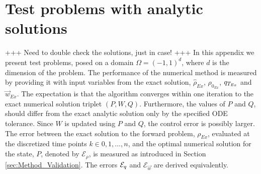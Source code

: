 \section{Test problems with analytic solutions}\label{app:TestProblems}
+++ Need to double check the solutions, just in case! +++
In this appendix we present test problems, posed on a domain $\Omega=(-1,1)^d$, where $d$ is the dimension of the problem. The performance of the numerical method is measured by providing it with input variables from the exact solution, $\widehat \rho_{Ex}$, $\rho_{0_{Ex}}$, $q_{T_{Ex}}$ and $\vec{w}_{Ex}$. The expectation is that the algorithm converges within one iteration to the exact numerical solution triplet $(P,W,Q)$. Furthermore, the values of $P$ and $Q$, should differ from the exact analytic solution only by the specified ODE tolerance. Since $W$ is updated using $P$ and $Q$, the control error is possibly larger.
The error between the exact solution to the forward problem, $\rho_{Ex}$, evaluated at the discretized time points $k \in 0,1,...,n$, and the optimal numerical solution for the state, $P$, denoted by $\mathcal{E}_\rho$, is measured as introduced in Section \ref{sec:Method_Validation}. The errors $\mathcal{E}_q$ and $\mathcal{E}_{\vec{w}}$ are derived equivalently.
\vspace{0.75em}

